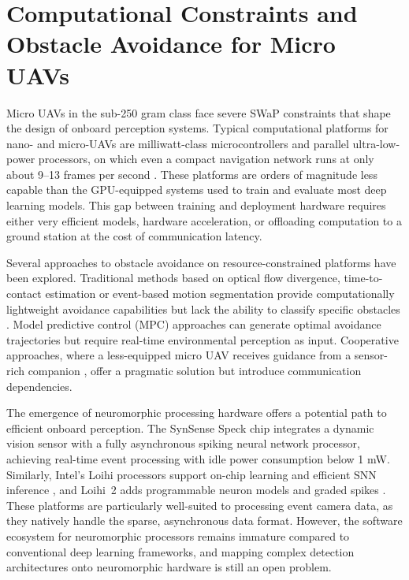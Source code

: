 \documentclass[11pt, a4paper]{report}
\begin{document}
\section{Computational Constraints and Obstacle Avoidance for Micro UAVs}
Micro UAVs in the sub-250 gram class face severe SWaP constraints that shape the design of onboard perception systems. Typical computational platforms for nano- and micro-UAVs are milliwatt-class microcontrollers and parallel ultra-low-power processors, on which even a compact navigation network runs at only about 9--13 frames per second \cite{niculescu2021improving}. These platforms are orders of magnitude less capable than the GPU-equipped systems used to train and evaluate most deep learning models. This gap between training and deployment hardware requires either very efficient models, hardware acceleration, or offloading computation to a ground station at the cost of communication latency.

Several approaches to obstacle avoidance on resource-constrained platforms have been explored. Traditional methods based on optical flow divergence, time-to-contact estimation or event-based motion segmentation provide computationally lightweight avoidance capabilities but lack the ability to classify specific obstacles \cite{falanga2020dynamic, decroon2016monocular}. Model predictive control (MPC) approaches can generate optimal avoidance trajectories but require real-time environmental perception as input. Cooperative approaches, where a less-equipped micro UAV receives guidance from a sensor-rich companion \cite{pritzl2024drones}, offer a pragmatic solution but introduce communication dependencies.

The emergence of neuromorphic processing hardware offers a potential path to efficient onboard perception. The SynSense Speck chip \cite{synsense2026speck} integrates a dynamic vision sensor with a fully asynchronous spiking neural network processor, achieving real-time event processing with idle power consumption below 1 mW. Similarly, Intel's Loihi processors support on-chip learning and efficient SNN inference \cite{davies2021advancing}, and Loihi~2 adds programmable neuron models and graded spikes \cite{orchard2021efficient}. These platforms are particularly well-suited to processing event camera data, as they natively handle the sparse, asynchronous data format. However, the software ecosystem for neuromorphic processors remains immature compared to conventional deep learning frameworks, and mapping complex detection architectures onto neuromorphic hardware is still an open problem.
\end{document}
